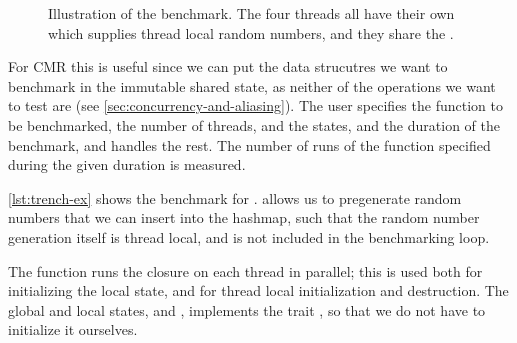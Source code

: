 \begin{figure}[ht]
  
  \caption{Illustration of the  benchmark. The four threads all have their own
   which supplies thread local random numbers, and they share the
  .}
\end{figure}

For CMR this is useful since we can put the data strucutres we want to
benchmark in the immutable shared state, as neither of the operations we want to test are
 (see \cref{sec:concurrency-and-aliasing}). The user specifies the function to be
benchmarked, the number of threads, and the states, and the duration of the benchmark, and
 handles the rest. The number of runs of the function specified during the given
duration is measured.


\cref{lst:trench-ex} shows the benchmark for .   allows us
to pregenerate random numbers that we can insert into the hashmap, such that the random number
generation itself is thread local, and is not included in the benchmarking loop.

The  function runs the closure on each thread in parallel; this is used both
for initializing the local state, and for thread local initialization and destruction.
The global and local states,  and , implements the trait
, so that we do not have to initialize it ourselves.
